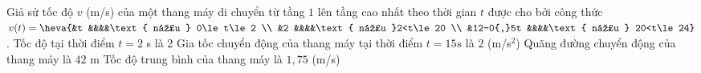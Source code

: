 \begin{ex}%
	Giả sử tốc độ $v$ (m/s) của một thang máy di chuyển từ tầng $1$ lên tầng cao nhất theo thời gian $t$ được cho bởi công thức $v(t)=\heva{&t &&&&\text{ nếu }  0\le t\le 2 \\ &2 &&&&\text{ nếu }2<t\le 20 \\ &12-0{,}5t &&&&\text{ nếu } 20<t\le 24}$.
	\choiceTF 
		{\True Tốc độ tại thời điểm $t=2$ s  là $2$}
		{Gia tốc chuyển động của thang máy tại thời điểm $t=15s$ là $2$  (m/s$^2$)}
		{\True Quãng đường chuyển động của  thang máy là $42$ m}
		{\True Tốc độ trung bình của thang máy  là $1{,}75$ (m/s)}
\end{ex}

